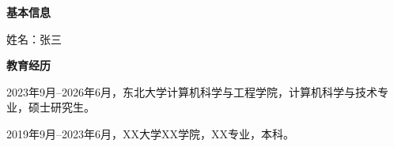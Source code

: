 \begin{resume}


\noindent\textbf{基本信息}

姓名：张三

\vspace{0.5em}
\noindent\textbf{教育经历}

2023年9月--2026年6月，东北大学计算机科学与工程学院，计算机科学与技术专业，硕士研究生。

2019年9月--2023年6月，XX大学XX学院，XX专业，本科。

\end{resume}
